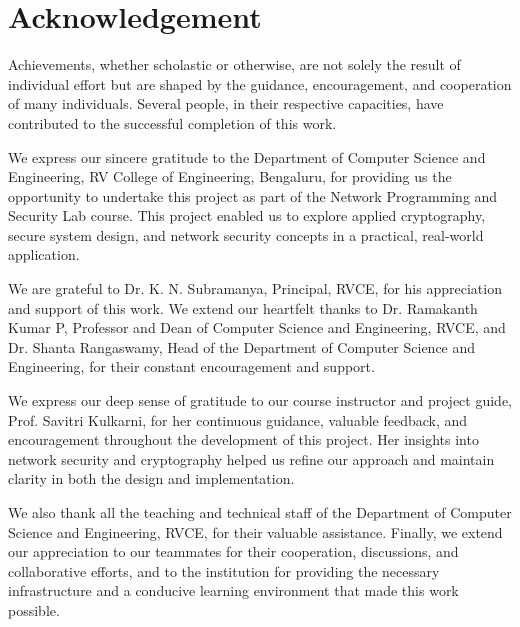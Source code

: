 
\newpage
\chapter*{Acknowledgement}

Achievements, whether scholastic or otherwise, are not solely the result of individual effort but are shaped by the guidance, encouragement, and cooperation of many individuals. Several people, in their respective capacities, have contributed to the successful completion of this work.

We express our sincere gratitude to the Department of Computer Science and Engineering, RV College of Engineering, Bengaluru, for providing us the opportunity to undertake this project as part of the Network Programming and Security Lab course. This project enabled us to explore applied cryptography, secure system design, and network security concepts in a practical, real-world application.

We are grateful to Dr. K. N. Subramanya, Principal, RVCE, for his appreciation and support of this work. We extend our heartfelt thanks to Dr. Ramakanth Kumar P, Professor and Dean of Computer Science and Engineering, RVCE, and Dr. Shanta Rangaswamy, Head of the Department of Computer Science and Engineering, for their constant encouragement and support.

We express our deep sense of gratitude to our course instructor and project guide, Prof. Savitri Kulkarni, for her continuous guidance, valuable feedback, and encouragement throughout the development of this project. Her insights into network security and cryptography helped us refine our approach and maintain clarity in both the design and implementation.

We also thank all the teaching and technical staff of the Department of Computer Science and Engineering, RVCE, for their valuable assistance. Finally, we extend our appreciation to our teammates for their cooperation, discussions, and collaborative efforts, and to the institution for providing the necessary infrastructure and a conducive learning environment that made this work possible.
